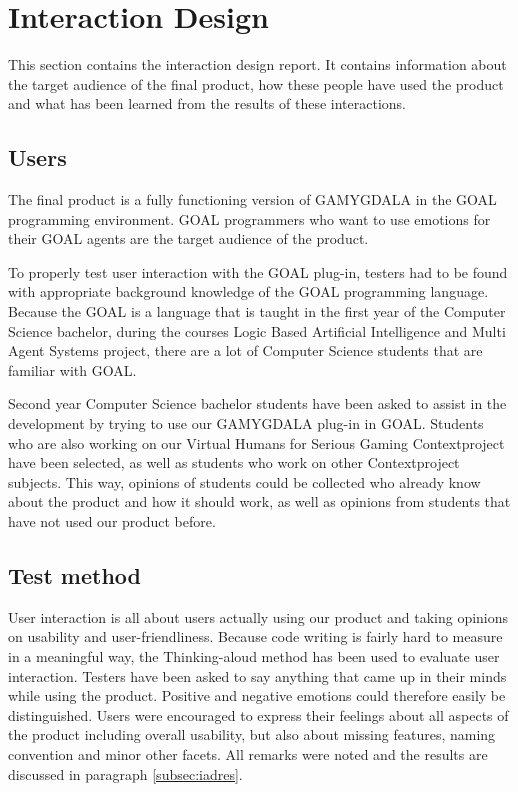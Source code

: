 \section{Interaction Design}
This section contains the interaction design report. It contains information about the target audience of the final product, how these people have used the product and what has been learned from the results of these interactions.

\subsection{Users}
The final product is a fully functioning version of GAMYGDALA in the GOAL programming environment. GOAL programmers who want to use emotions for their GOAL agents are the target audience of the product.

To properly test user interaction with the GOAL plug-in, testers had to be found with appropriate background knowledge of the GOAL programming language. Because the GOAL is a language that is taught in the first year of the Computer Science bachelor, during the courses Logic Based Artificial Intelligence and Multi Agent Systems project, there are a lot of Computer Science students that are familiar with GOAL.

Second year Computer Science bachelor students have been asked to assist in the development by trying to use our GAMYGDALA plug-in in GOAL. Students who are also working on our Virtual Humans for Serious Gaming Contextproject have been selected, as well as students who work on other Contextproject subjects. This way, opinions of students could be collected who already know about the product and how it should work, as well as opinions from students that have not used our product before.

\subsection{Test method}
User interaction is all about users actually using our product and taking opinions on usability and user-friendliness. Because code writing is fairly hard to measure in a meaningful way, the Thinking-aloud method \citep{thinking-aloud} has been used to evaluate user interaction. Testers have been asked to say anything that came up in their minds while using the product. Positive and negative emotions could therefore easily be distinguished. Users were encouraged to express their feelings about all aspects of the product including overall usability, but also about missing features, naming convention and minor other facets. All remarks were noted and the results are discussed in paragraph \ref{subsec:iadres}.

